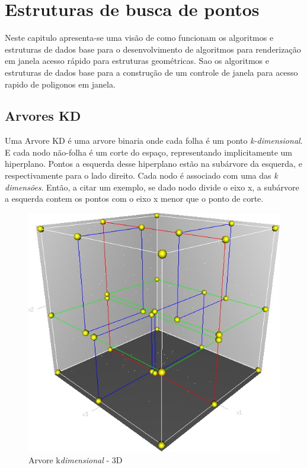 \chapter{Estruturas de busca de pontos}\label{cap:desenvolvimento}
Neste capitulo apresenta-se uma visão de como funcionam os algoritmos e estruturas de dados base para o desenvolvimento
de algoritmos para renderização em janela acesso rápido para estruturas geométricas.
Sao os algoritmos e estruturas de dados base para a construção de um controle de janela para acesso rapido de poligonos
em janela.



\section{Arvores KD}

Uma Arvore KD é uma arvore binaria onde cada folha é um ponto \textit{k-dimensional}.
E cada nodo não-folha é um corte do espaço, representando implicitamente um hiperplano.
Pontos a esquerda desse hiperplano estão na subárvore da esquerda, e respectivamente para o lado direito.
Cada nodo é associado com uma das \textit{k dimensões}. Então, a citar um exemplo, se dado nodo divide o eixo
x, a subárvore a esquerda contem os pontos com o eixo x menor que o ponto de corte.

\begin{figure}[htb]
    \caption{\label{fig:Fig_1}Arvore k\textit{dimensional} - 3D}
    \begin{center}
        \includegraphics[width=\linewidth/2]{./images/3dtree.png}
    \end{center}
\end{figure}

